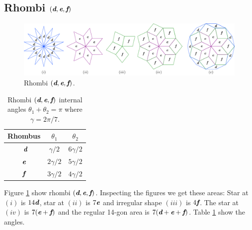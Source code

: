 \documentclass[11pt]{article}
\def\mathbi#1{\textbf{\em #1}}
\begin{document}
\subsection{Rhombi $(\mathbi{d},\mathbi{e},\mathbi{f})$}

\begin{figure}[H]
\centering
\includegraphics[scale=0.9]{def/rhombi}
\caption{Rhombi $(\mathbi{d},\mathbi{e},\mathbi{f})$.}
\label{fig:def-rhombi}
\end{figure}

\begin{table}[H]
\begin{center}
\begin{tabular}{|c|c c|}
\hline
Rhombus & $\theta_1$ & $\theta_2$ \\ %
\hline\
$\mathbi{d}$ & $\gamma/2$ & $6\gamma/2$ \\[0.5ex] \hline
$\mathbi{e}$ & $2\gamma/2$ & $5\gamma/2$ \\[0.5ex] \hline
$\mathbi{f}$ & $3\gamma/2$ & $4\gamma/2$ \\[0.5ex] \hline
\end{tabular}
\caption{Rhombi $(\mathbi{d},\mathbi{e},\mathbi{f})$ internal angles $\theta_1 + \theta_2 = \pi$ where $\gamma = 2\pi/7$.} 
\label{tbl:def-angles}
\end{center}
\end{table}

Figure \ref{fig:def-rhombi} show rhombi $(\mathbi{d},\mathbi{e},\mathbi{f})$. 
Inspecting the figures we get these areas:
Star at $(i)$ is $14\mathbi{d}$, star at $(ii)$ is $7\mathbi{e}$ and irregular shape $(iii)$ is $4\mathbi{f}$. The star at $(iv)$ is $7(\mathbi{e} + \mathbi{f})$ and the regular 14-gon area is $7(\mathbi{d} + \mathbi{e} + \mathbi{f})$. Table \ref {tbl:def-angles} show the angles.
\end{document}
